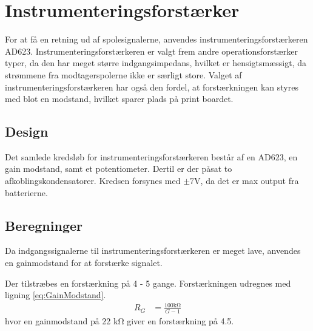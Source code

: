 \section{Instrumenteringsforstærker}\label{sec:summa}
For at få en retning ud af spolesignalerne, anvendes instrumenteringsforstærkeren AD623. Instrumenteringsforstærkeren er valgt frem andre operationsforstærker typer, da den har meget større indgangsimpedans, hvilket er hensigtsmæssigt, da strømmene fra modtagerspolerne ikke er særligt store. Valget af instrumenteringsforstærkeren har også den fordel, at forstærkningen kan styres med blot en modstand, hvilket sparer plads på print boardet.


\subsection{Design}
Det samlede kredsløb for instrumenteringsforstærkeren består af en AD623, en gain modstand, samt et potentiometer. Dertil er der påsat to afkoblingskondensatorer. Kredsen forsynes med $\pm 7 \si{\volt}$, da det er max output fra batterierne. 


\subsection{Beregninger}
Da indgangssignalerne til instrumenteringsforstærkeren er meget lave, anvendes en gainmodstand for at forstærke signalet.

Der tilstræbes en forstærkning på 4 - 5 gange. Forstærkningen udregnes med ligning \ref{eq:GainModstand}.
\begin{align}
	R_G & = \frac{100 \si{\kilo\ohm}}{G-1} \label{eq:GainModstand}
\end{align}
hvor en gainmodstand på 22 \si{\kilo\ohm} giver en forstærkning på 4.5.
